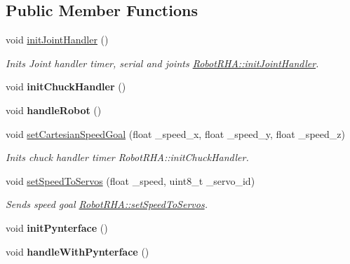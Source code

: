 \subsection*{Public Member Functions}
\begin{DoxyCompactItemize}
\item 
void \hyperlink{classRobotRHA_a169b8296ae6a272c74bc88ff4f938e01}{init\+Joint\+Handler} ()\hypertarget{classRobotRHA_a169b8296ae6a272c74bc88ff4f938e01}{}\label{classRobotRHA_a169b8296ae6a272c74bc88ff4f938e01}

\begin{DoxyCompactList}\small\item\em Inits Joint handler timer, serial and joints  \hyperlink{classRobotRHA_a169b8296ae6a272c74bc88ff4f938e01}{Robot\+R\+H\+A\+::init\+Joint\+Handler}. \end{DoxyCompactList}\item 
void {\bfseries init\+Chuck\+Handler} ()\hypertarget{classRobotRHA_ad7c99cfb0d0f64e6aea478965cc7694a}{}\label{classRobotRHA_ad7c99cfb0d0f64e6aea478965cc7694a}

\item 
void {\bfseries handle\+Robot} ()\hypertarget{classRobotRHA_ae7a8c12f3c25f0e07d14e28409773ad1}{}\label{classRobotRHA_ae7a8c12f3c25f0e07d14e28409773ad1}

\item 
void \hyperlink{classRobotRHA_a35a251c4f48bb84892109b6c1b22aad4}{set\+Cartesian\+Speed\+Goal} (float \+\_\+speed\+\_\+x, float \+\_\+speed\+\_\+y, float \+\_\+speed\+\_\+z)
\begin{DoxyCompactList}\small\item\em Inits chuck handler timer  Robot\+R\+H\+A\+::init\+Chuck\+Handler. \end{DoxyCompactList}\item 
void \hyperlink{classRobotRHA_a2340f69cfc12b844b516621d867f992e}{set\+Speed\+To\+Servos} (float \+\_\+speed, uint8\+\_\+t \+\_\+servo\+\_\+id)
\begin{DoxyCompactList}\small\item\em Sends speed goal  \hyperlink{classRobotRHA_a2340f69cfc12b844b516621d867f992e}{Robot\+R\+H\+A\+::set\+Speed\+To\+Servos}. \end{DoxyCompactList}\item 
void {\bfseries init\+Pynterface} ()\hypertarget{classRobotRHA_a40cb5e4a3ca89ac3d0ae6542919de7b1}{}\label{classRobotRHA_a40cb5e4a3ca89ac3d0ae6542919de7b1}

\item 
void {\bfseries handle\+With\+Pynterface} ()\hypertarget{classRobotRHA_a41b9f580e6a80d327c7cefc3526a39d2}{}\label{classRobotRHA_a41b9f580e6a80d327c7cefc3526a39d2}


\end{DoxyCompactItemize}
